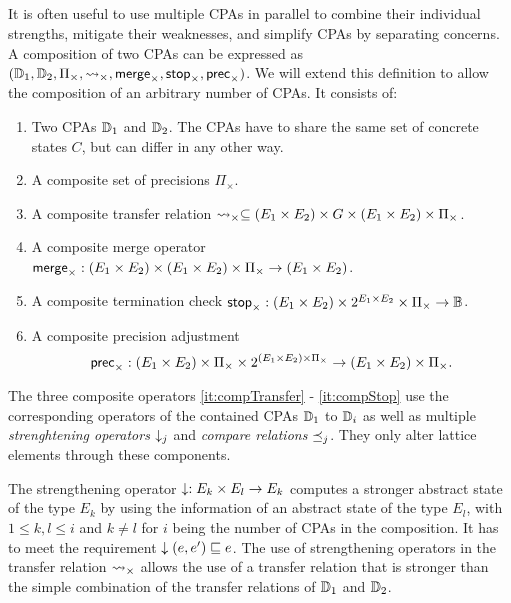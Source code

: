 \subsection{\CompositeCPA}
It is often useful to use multiple CPAs in parallel to combine their individual strengths, mitigate their weaknesses, and simplify CPAs by separating concerns.
A composition of two CPAs \cite{Beyer2008} can be expressed as $(\mathbb{D}_1, \mathbb{D}_2, \Pi_\times, \rightsquigarrow_\times, \operatorname{\operatorname{\mathsf{merge}}}_\times, \operatorname{\operatorname{\mathsf{stop}}}_\times, \operatorname{\operatorname{\mathsf{prec}}}_\times)$.
We will extend this definition to allow the composition of an arbitrary number of CPAs.
It consists of:
\begin{enumerate}[leftmargin=*, label=\arabic*.]

\item Two CPAs $\mathbb{D}_1$ and $\mathbb{D}_2$. The CPAs have to share the same set of concrete states $C$, but can differ in any other way.
\item A composite set of precisions $\Pi_\times$.
\item \label{it:compTransfer} A composite transfer relation $\rightsquigarrow_\times \subseteq (E_1 \times E_2) \times G \times (E_1 \times E_2) \times \Pi_\times$.
\item \label{it:compMerge} A composite merge operator $\operatorname{\operatorname{\mathsf{merge}}}_\times : (E_1 \times E_2) \times (E_1 \times E_2) \times \Pi_\times \rightarrow (E_1 \times E_2)$.
\item \label{it:compStop} A composite termination check $\operatorname{\operatorname{\mathsf{stop}}}_\times : (E_1 \times E_2) \times 2^{E_1 \times E_2} \times \Pi_\times \rightarrow \mathbb{B}$.
\item A composite precision adjustment \[\operatorname{\operatorname{\mathsf{prec}}}_\times : (E_1 \times E_2) \times \Pi_\times \times 2^{(E_1 \times E_2) \times \Pi_\times} \rightarrow (E_1 \times E_2) \times \Pi_\times.\]
\end{enumerate}
The three composite operators \ref{it:compTransfer} - \ref{it:compStop} use the corresponding operators of the contained CPAs $\mathbb{D}_1$ to $\mathbb{D}_i$ as well as multiple \emph{strenghtening operators} $\downarrow_j$ and \emph{compare relations} $\preceq_j$. They only alter lattice elements through these components.

The strengthening operator $\downarrow : E_k \times E_l \rightarrow E_k$ computes a stronger abstract state of the type $E_k$ by using the information of an abstract state of the type $E_l$,
with $1 \leq k,l \leq i$ and $k \neq l$ for $i$ being the number of CPAs in the composition.
It has to meet the requirement $\downarrow(e, e') \sqsubseteq e$.
The use of strengthening operators in the transfer relation $\rightsquigarrow_\times$ allows the use of a transfer relation that is stronger than the simple combination of the transfer relations of $\mathbb{D}_1$ and $\mathbb{D}_2$.

